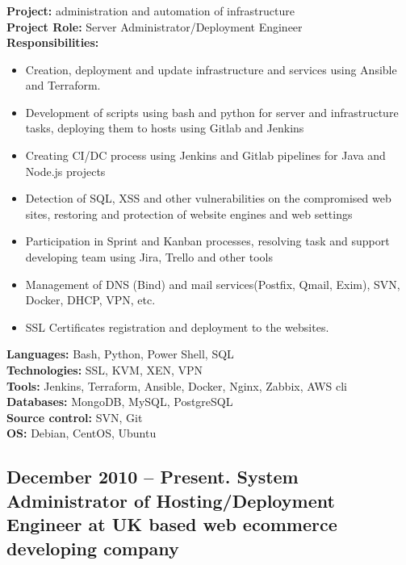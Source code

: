 \documentclass[letterpaper]{article}
\begin{document}
\subsubsection{}
\label{sec-2-1-1}
\textbf{Project:} administration and automation of infrastructure\\
\textbf{Project Role:}  Server Administrator/Deployment Engineer\\
\textbf{Responsibilities:}\\
\begin{itemize}
\item Creation, deployment and update infrastructure and services using Ansible and Terraform.
\item Development of scripts using bash and python for server and infrastructure tasks, deploying them to hosts using Gitlab and Jenkins
\item Creating CI/DC process using Jenkins and Gitlab pipelines for Java and Node.js projects
\item Detection of SQL, XSS and other vulnerabilities on the compromised web sites, restoring and protection of website engines and web settings
\item Participation in Sprint and Kanban processes, resolving task and support developing team using Jira, Trello and other tools
\item Management of DNS (Bind) and mail services(Postfix, Qmail, Exim), SVN, Docker, DHCP, VPN, etc.
\item SSL Certificates registration and deployment to the websites.
\end{itemize}
\textbf{Languages:} Bash, Python, Power Shell, SQL\\
\textbf{Technologies:} SSL, KVM, XEN, VPN\\
\textbf{Tools:} Jenkins, Terraform, Ansible, Docker, Nginx, Zabbix, AWS cli\\ 
\textbf{Databases:} MongoDB, MySQL, PostgreSQL\\
\textbf{Source control:} SVN, Git\\
\textbf{OS:} Debian, CentOS, Ubuntu \\
\subsection{{December 2010 – Present}. System Administrator of Hosting/Deployment Engineer at UK based web ecommerce developing company}
\label{sec-2-1}
\end{document}
